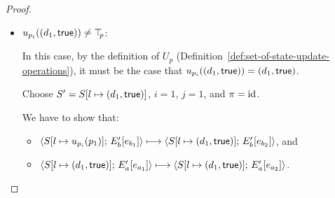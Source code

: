 \begin{proof}
\begin{enumerate}
\begin{enumerate}
\begin{itemize}
\begin{itemize}
            \item $u_{p_i}((d_1, \textsf{true})) \neq \top\hspace{-0.85mm}_{p}$:


              In this case, by the definition of $U_p$
              (Definition~\ref{def:set-of-state-update-operations}),
              it must be the case that
              $u_{p_i}((d_1, \textsf{true})) =
              (d_1, \textsf{true})$.

              Choose $S' = S[l \mapsto (d_1, \textsf{true})]$, $i = 1$, $j
              = 1$, and $\pi = \mathrm{id}$.

              We have to show that:
              \begin{itemize}
              \item
                $\langle S[l \mapsto u_{p_i}(p_1)];\, E'_b\hspace{-0.5mm}\left[e_{b_1}\right] \rangle
                \longmapsto
                \langle S[l \mapsto (d_1, \textsf{true})];\, E'_b\hspace{-0.5mm}\left[e_{b_2}\right] \rangle$,
                and
              \item
                $\langle S[l \mapsto (d_1, \textsf{true})];\, E'_a\hspace{-0.5mm}\left[e_{a_1}\right] \rangle
                \longmapsto
                \langle S[l \mapsto (d_1, \textsf{true})];\, E'_a\hspace{-0.5mm}\left[e_{a_2}\right] \rangle$.
              \end{itemize}


\end{itemize}
\end{itemize}
\end{enumerate}
\end{enumerate}
\end{proof}

